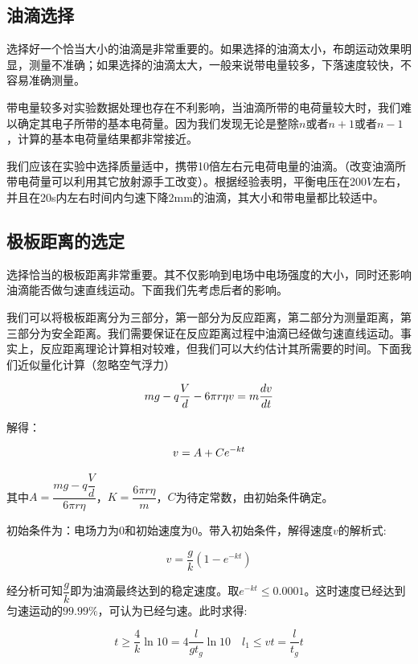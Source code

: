 \documentclass[paper=a4, fontsize=11pt]{scrartcl} %
\numberwithin{equation}{section} %
\numberwithin{figure}{section} %
\numberwithin{table}{section} %
\begin{document}
\subsection{\kaishu 油滴选择}
选择好一个恰当大小的油滴是非常重要的。如果选择的油滴太小，布朗运动效果明显，测量不准确；如果选择的油滴太大，一般来说带电量较多，下落速度较快，不容易准确测量。

带电量较多对实验数据处理也存在不利影响，当油滴所带的电荷量较大时，我们难以确定其电子所带的基本电荷量。因为我们发现无论是整除$n$或者$n+1$或者$n-1$，计算的基本电荷量结果都非常接近。

我们应该在实验中选择质量适中，携带10倍左右元电荷电量的油滴。（改变油滴所带电荷量可以利用其它放射源手工改变）。根据经验表明，平衡电压在200$V$左右，并且在20s内左右时间内匀速下降2mm的油滴，其大小和带电量都比较适中。

\subsection{\kaishu 极板距离的选定}
选择恰当的极板距离非常重要。其不仅影响到电场中电场强度的大小，同时还影响油滴能否做匀速直线运动。下面我们先考虑后者的影响。

我们可以将极板距离分为三部分，第一部分为反应距离，第二部分为测量距离，第三部分为安全距离。我们需要保证在反应距离过程中油滴已经做匀速直线运动。事实上，反应距离理论计算相对较难，但我们可以大约估计其所需要的时间。下面我们近似量化计算（忽略空气浮力）

\begin{displaymath}
\centering
mg-q\dfrac{V}{d}-6\pi r \eta v = m\dfrac{dv}{dt}
\end{displaymath}

解得：

\begin{displaymath}
	\centering
v = A + Ce^{-kt}
\end{displaymath}

其中$A=\dfrac{mg-q\dfrac{V}{d}}{6\pi r \eta}$，$K=\dfrac{6\pi r \eta}{m}$，$C$为待定常数，由初始条件确定。

初始条件为：电场力为0和初始速度为0。带入初始条件，解得速度$v$的解析式:

\begin{displaymath}
	v=\dfrac{g}{k}(1-e^{-kt})
\end{displaymath}

经分析可知$\dfrac{g}{k}$即为油滴最终达到的稳定速度。取$e^{-kt}\leq 0.0001$。这时速度已经达到匀速运动的$99.99\%$，可认为已经匀速。此时求得:

\begin{displaymath}
	t \geq \dfrac{4}{k} \ln{10}=4\dfrac{l}{gt_g}\ln{10}
	\quad
	l_1 \leq vt=\dfrac{l}{t_g}t
\end{displaymath}
\end{document}
